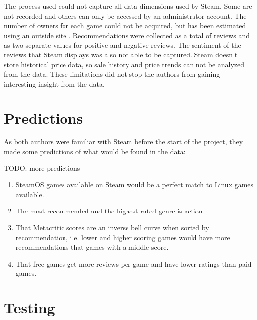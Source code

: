 \documentclass[letterpaper,10pt,twocolumn]{article}
\begin{document}
The process used could not capture all data dimensions used by Steam. Some are
not recorded and others can only be accessed by an administrator account. The
number of owners for each game could not be acquired, but has been estimated
using an outside site \cite{steamspy}. Recommendations were collected as a
total of reviews and as two separate values for positive and negative reviews.
The sentiment of the reviews that Steam displays was also not able to be
captured. Steam doesn't store historical price data, so sale history and
price trends can not be analyzed from the data. These limitations did not stop
the authors from gaining interesting insight from the data.



\section{Predictions}

As both authors were familiar with Steam before the start of the project, they
made some predictions of what would be found in the data:

TODO: more predictions

\begin{enumerate}
    \item SteamOS games available on Steam would be a perfect match to Linux
    games available.

    \item The most recommended and the highest rated genre is action.

    \item That Metacritic scores are an inverse bell curve when sorted by
    recommendation, i.e. lower and higher scoring games would have more
    recommendations that games with a middle score.

    \item That free games get more reviews per game and have lower ratings than
    paid games.
\end{enumerate}



\section{Testing}
\end{document}
